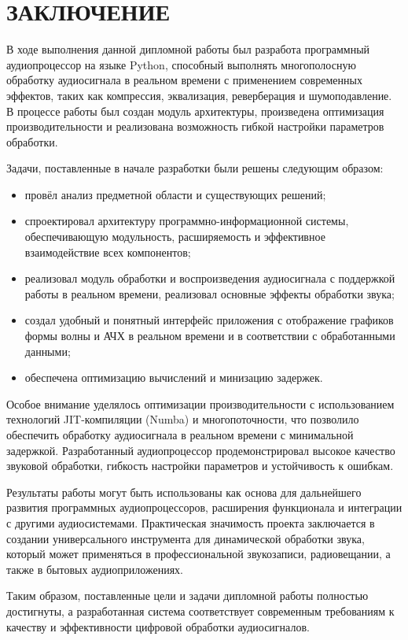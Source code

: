 \section*{ЗАКЛЮЧЕНИЕ}

В ходе выполнения данной дипломной работы был разработа программный аудиопроцессор на языке Python, способный выполнять многополосную обработку аудиосигнала в реальном времени с применением современных эффектов, таких как компрессия, эквализация, реверберация и шумоподавление. В процессе работы был создан модуль архитектуры, произведена оптимизация производительности и реализована возможность гибкой настройки параметров обработки.

Задачи, поставленные в начале разработки были решены следующим образом:
\begin{itemize}
	\item провёл анализ предметной области и существующих решений;
	\item спроектировал архитектуру программно-информационной системы, обеспечивающую модульность, расширяемость и эффективное взаимодействие всех компонентов;
	\item реализовал модуль обработки и воспроизведения аудиосигнала с поддержкой работы в реальном времени, реализовал основные эффекты обработки звука;
	\item создал удобный и понятный интерфейс приложения с отображение графиков формы волны и АЧХ в реальном времени и в соответствии с обработанными данными;
	\item обеспечена оптимизацию вычислений и минизацию задержек.
\end{itemize}

Особое внимание уделялось оптимизации производительности с использованием технологий JIT-компиляции (Numba) и многопоточности, что позволило обеспечить обработку аудиосигнала в реальном времени с минимальной задержкой. Разработанный аудиопроцессор продемонстрировал высокое качество звуковой обработки, гибкость настройки параметров и устойчивость к ошибкам.

Результаты работы могут быть использованы как основа для дальнейшего развития программных аудиопроцессоров, расширения функционала и интеграции с другими аудиосистемами. Практическая значимость проекта заключается в создании универсального инструмента для динамической обработки звука, который может применяться в профессиональной звукозаписи, радиовещании, а также в бытовых аудиоприложениях.

Таким образом, поставленные цели и задачи дипломной работы полностью достигнуты, а разработанная система соответствует современным требованиям к качеству и эффективности цифровой обработки аудиосигналов.